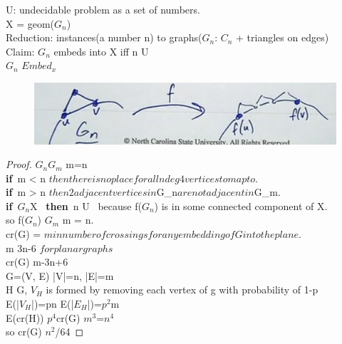 \documentclass{article}
\begin{document}
U: undecidable problem as a set of numbers.\\
X = geom($G_n$)\\
Reduction: instances(a number n) to graphs($G_n$: $C_n$ + triangles on edges)\\
Claim: $G_n$ embeds into X iff n \in U\\$G_n$ \in $Embed_x$
    \begin{figure}[h!]
		\begin{center}
			\includegraphics[scale=0.3]{fig3}
		\end{center}
	\end{figure}
\begin{proof}
$G_n$\hookrightarrow$G_m$ \implies m=n\\
{\bf if}\ m < n $ then there is no place for all n deg 4 vertices to map to.$\\
{\bf if}\ m > n $ then 2 adjacent vertices in $G_n$ are not adjacent in $G_m$.$\\
{\bf if}\ $G_n$\hookrightarrow X \ {\bf then}\ n \in U \ because f($G_n$) is in some connected component of X.\\
so f($G_n$) \subseteq $G_m$ \implies m = n.\\
cr(G) = $min number of crossings for any embedding of G into the plane.$\\
m \leq 3n-6 $ for planar graphs$ \\
cr(G) \geq m-3n+6\\
G=(V, E) |V|=n, |E|=m\\
H \subseteq G, $V_H$ is formed by removing each vertex of g with probability of 1-p\\
E(|$V_H$|)=pn E(|$E_H$|)=$p^2$m\\
E(cr(H)) \leq $p^4$cr(G) $m^3$=$n^4$\\
so cr(G) \geq $n^2$/64
\end{proof}
\end{document}
